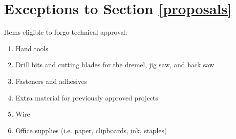 \section{Exceptions to Section \ref{proposals}}
\label{allowed_items}
Items eligible to forgo technical approval:
\begin{enumerate}
\item Hand tools
\item Drill bits and cutting blades for the dremel, jig saw, and hack saw
\item Fasteners and adhesives
\item Extra material for previously approved projects
\item Wire
\item Office supplies (i.e. paper, clipboards, ink, staples)
\end{enumerate}